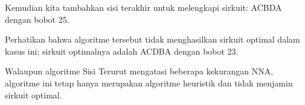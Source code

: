 \begin{example}
Kemudian kita tambahkan sisi terakhir untuk melengkapi sirkuit: ACBDA dengan bobot 25.  \\

\begin{center}
\end{center}

Perhatikan bahwa algoritme tersebut tidak menghasilkan sirkuit optimal dalam kasus ini; sirkuit optimalnya adalah ACDBA dengan bobot 23.  
\end{example}

Walaupun algoritme Sisi Terurut mengatasi beberapa kekurangan NNA, algoritme ini tetap hanya merupakan algoritme heuristik dan tidak menjamin sirkuit optimal.

